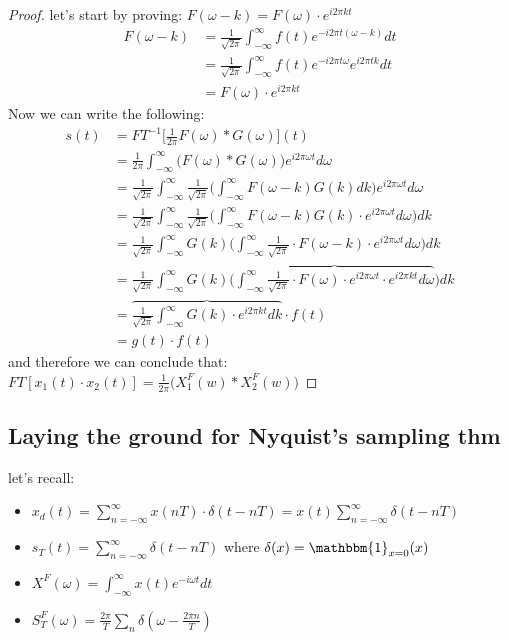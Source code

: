 \documentclass{article}
\begin{document}
\begin{proof}
let's start by proving: $F(\omega -k) = F(\omega)\cdot e^{i2\pi k t} $
\newline
\begin{equation}
    \begin{aligned}
        F(\omega -k) & = \frac{1}{\sqrt{2\pi}}\int^{\infty}_{-\infty}f(t)e^{-i2\pi t(\omega -k)}dt\\
        & = \frac{1}{\sqrt{2\pi}}\int^{\infty}_{-\infty}f(t)e^{-i2\pi t\omega}e^{i2\pi t k}dt\\
        & = F(\omega)\cdot e^{i2\pi k t}
    \end{aligned}
\end{equation}
Now we can write the following:
\begin{equation}
    \begin{aligned}
        s(t) &= FT^{-1}\bigg[\frac{1}{2\pi}F(\omega) \ast G(\omega)\bigg](t)\\
        & = \frac{1}{2\pi}\int^\infty_{-\infty}\big(F(\omega)\ast G(\omega)\big)e^{i2\pi \omega t} d\omega\\
        & = \frac{1}{\sqrt{2\pi}}\int^\infty_{-\infty}\frac{1}{\sqrt{2\pi}}\bigg(\int^\infty_{-\infty}F(\omega-k)G(k) dk\bigg)e^{i2\pi \omega t} d\omega\\
        & = \frac{1}{\sqrt{2\pi}}\int^\infty_{-\infty}\frac{1}{\sqrt{2\pi}}\bigg(\int^\infty_{-\infty}F(\omega-k)G(k)\cdot e^{i2\pi \omega t} d\omega\bigg) dk\\
        & = \frac{1}{\sqrt{2\pi}}\int^\infty_{-\infty} G(k)\bigg(\int^\infty_{-\infty}\frac{1}{\sqrt{2\pi}}\cdot F(\omega-k)\cdot e^{i2\pi \omega t} d\omega\bigg) dk\\
        & = \frac{1}{\sqrt{2\pi}}\int^\infty_{-\infty} G(k)\bigg(\overbrace{\int^\infty_{-\infty}\frac{1}{\sqrt{2\pi}}\cdot F(\omega)\cdot e^{i2\pi \omega t}\cdot e^{i2\pi kt} d\omega}\bigg) dk\\
        & = \overbrace{\frac{1}{\sqrt{2\pi}}\int^\infty_{-\infty}  G(k) \cdot e^{i2\pi kt} dk} \cdot f(t) \\
        & = g(t) \cdot f(t)
    \end{aligned}
\end{equation}
and therefore we can conclude that: $FT[x_1(t)\cdot x_2(t)]= \frac{1}{2\pi} \big ( X^F_1(w)\ast X^F_2 (w)\big)$
\end{proof}

\subsection{Laying the ground for Nyquist’s sampling thm}
let's recall:
\begin{itemize}
    \item $x_d(t) = \sum^\infty_{n=-\infty}x(nT)\cdot \delta(t-nT)=x(t)\sum^\infty_{n=-\infty}\delta(t-nT)$ 
    \item $s_T(t) = \sum^\infty_{n=-\infty}\delta(t-nT)$ where $\delta(x) = \mathbbm{1}_{x=0}(x)$
    \item $X^F(\omega)= \int^\infty_{-\infty}x(t)e^{-i\omega t}dt $
    \item $S^F_T(\omega) = \frac{2\pi}{T} \sum_n \delta(\omega-\frac{2\pi n}{T})$
\end{itemize}
\end{document}
